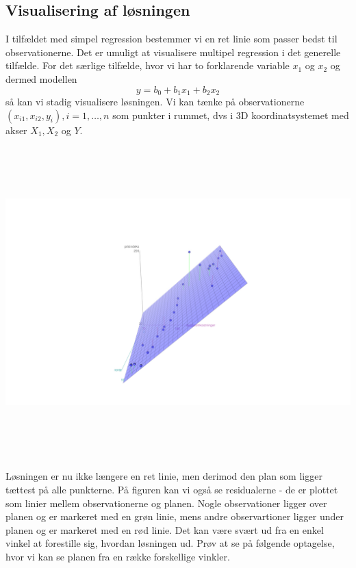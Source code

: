 \subsection{Visualisering af løsningen}
I tilfældet med simpel regression bestemmer vi en ret linie som passer bedst til observationerne. Det er umuligt at visualisere multipel regression i det generelle tilfælde. For det særlige tilfælde, hvor vi har to forklarende variable \(x_1\) og \(x_2\) og dermed modellen
\begin{displaymath}
  y = b_0 + b_1 x_1 + b_2 x_2
\end{displaymath}
så kan vi stadig visualisere løsningen. Vi kan tænke på observationerne \((x_{i1}, x_{i2}, y_i), i=1,\ldots,n\) som punkter i rummet, dvs i 3D koordinatsystemet med akser \(X_1, X_2\) og \(Y\).
\begin{center}
\includegraphics[height=12cm]{regression/images/visualisering.JPG}
\end{center}
Løsningen er nu ikke længere en ret linie, men derimod den plan som ligger tættest på alle punkterne. På figuren kan vi også se residualerne - de er plottet som linier mellem observationerne og planen. Nogle observationer ligger over planen og er markeret med en grøn linie, mens andre observartioner ligger under planen og er markeret med en rød linie.
Det kan være svært ud fra en enkel vinkel at forestille sig, hvordan løsningen ud. Prøv at se på følgende optagelse, hvor vi kan se planen fra en række forskellige vinkler.

